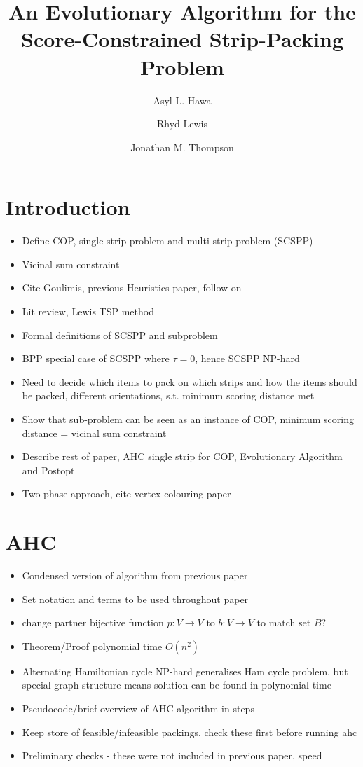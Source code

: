 \documentclass{elsarticle}
\begin{document}
	
\begin{frontmatter}
\title{An Evolutionary Algorithm for the Score-Constrained Strip-Packing Problem}
\author{Asyl L. Hawa}
\author{Rhyd Lewis}
\author{Jonathan M. Thompson}
\address{School of Mathematics, Cardiff University, Senghennydd Road, Cardiff, UK}
\end{frontmatter}


\section{Introduction}
\begin{itemize}
	\item Define COP, single strip problem and multi-strip problem (SCSPP)
	\item Vicinal sum constraint
	\item Cite Goulimis, previous Heuristics paper, follow on
	\item Lit review, Lewis TSP method
	\item Formal definitions of SCSPP and subproblem
	\item BPP special case of SCSPP where $\tau = 0$, hence SCSPP NP-hard
	\item Need to decide which items to pack on which strips and how the items should be packed, different orientations, s.t. minimum scoring distance met
	\item Show that sub-problem can be seen as an instance of COP, minimum scoring distance = vicinal sum constraint
	\item Describe rest of paper, AHC single strip for COP, Evolutionary Algorithm and Postopt
	\item Two phase approach, cite vertex colouring paper
\end{itemize}

\section{AHC}
\begin{itemize}
	\item Condensed version of algorithm from previous paper
	\item Set notation and terms to be used throughout paper
	\item change partner bijective function $p:V \to V$ to $b : V \to V$ to match set $B$?
	\item Theorem/Proof polynomial time $O(n^2)$
	\item Alternating Hamiltonian cycle NP-hard generalises Ham cycle problem, but special graph structure means solution can be found in polynomial time
	\item Pseudocode/brief overview of AHC algorithm in steps
	\item Keep store of feasible/infeasible packings, check these first before running ahc
	\item Preliminary checks - these were not included in previous paper, speed
\end{itemize}
\end{document}
